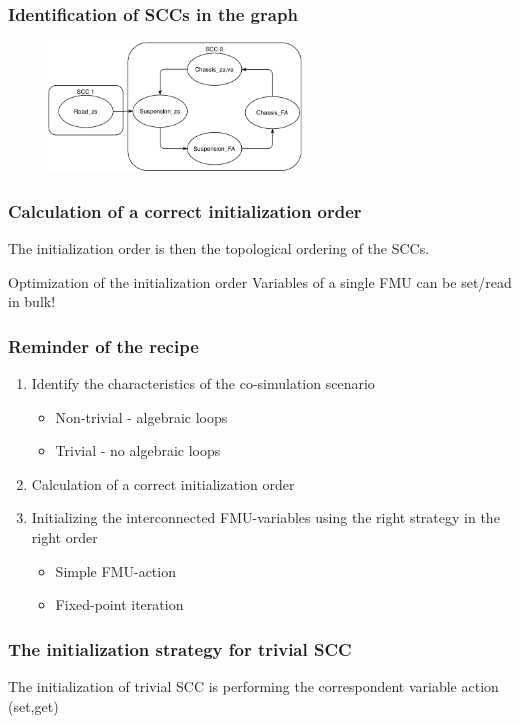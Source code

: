 \documentclass{beamer}
\begin{document}
\begin{frame}
\frametitle{Identification of SCCs in the graph}
\begin{figure}
    \centering
    \includegraphics[width=0.6\textwidth]{images/quarter_car-SCC.pdf}
\end{figure}

\end{frame}

\begin{frame}
\frametitle{Calculation of a correct initialization order}
The initialization order is then the topological ordering of the SCCs.

\begin{exampleblock}{Optimization of the initialization order}
Variables of a single FMU can be set/read in bulk!
\end{exampleblock}
\end{frame}

\begin{frame}
\frametitle{Reminder of the recipe}
\begin{enumerate}[I]
    \item Identify the characteristics of the co-simulation scenario
    \begin{itemize}
        \item Non-trivial - algebraic loops
        \item Trivial - no algebraic loops
    \end{itemize}
    \item Calculation of a correct initialization order
    \item Initializing the interconnected FMU-variables using the right strategy in the right order
    \begin{itemize}
        \item Simple FMU-action
        \item Fixed-point iteration
    \end{itemize}
\end{enumerate}
\end{frame}

\begin{frame}
\frametitle{The initialization strategy for trivial SCC}
The initialization of trivial SCC is performing the correspondent variable action (set,get) 
    
\end{frame}
        
\end{document}
